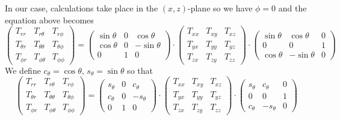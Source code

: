 In our case, calculations take place in the 
$(x,z)$-plane so we have $\phi=0$ and the equation above 
becomes
\[
\left(
\begin{array}{ccc}
T_{rr}       & T_{r\theta}      & T_{r\phi} \\
T_{\theta r} & T_{\theta\theta} & T_{\theta\phi} \\
T_{\phi r}   & T_{\phi \theta}  & T_{\phi\phi}
\end{array}
\right)
=
\left(
\begin{array}{ccc}
\sin\theta  & 0 & \cos\theta \\
\cos\theta  & 0 & -\sin\theta \\
0 & 1 & 0 
\end{array}
\right)
\cdot
\left(
\begin{array}{ccc}
T_{xx} & T_{xy} & T_{xz} \\
T_{yx} & T_{yy} & T_{yz} \\
T_{zx} & T_{zy} & T_{zz} 
\end{array}
\right)
\cdot
\left(
\begin{array}{ccc}
\sin\theta & \cos\theta & 0 \\
0 & 0 & 1 \\
\cos\theta & -\sin\theta & 0
\end{array}
\right)
\]
We define $c_\theta=\cos\theta$, $s_\theta=\sin\theta$ so that
\[
\left(
\begin{array}{ccc}
T_{rr}       & T_{r\theta}      & T_{r\phi} \\
T_{\theta r} & T_{\theta\theta} & T_{\theta\phi} \\
T_{\phi r}   & T_{\phi \theta}  & T_{\phi\phi}
\end{array}
\right)
=
\left(
\begin{array}{ccc}
s_\theta  & 0 & c_\theta \\
c_\theta  & 0 & -s_\theta \\
0 & 1 & 0 
\end{array}
\right)
\cdot
\left(
\begin{array}{ccc}
T_{xx} & T_{xy} & T_{xz} \\
T_{yx} & T_{yy} & T_{yz} \\
T_{zx} & T_{zy} & T_{zz} 
\end{array}
\right)
\cdot
\left(
\begin{array}{ccc}
s_\theta & c_\theta & 0 \\
0 & 0 & 1 \\
c_\theta & -s_\theta & 0
\end{array}
\right)
\]

